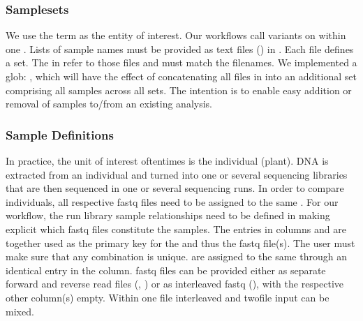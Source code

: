 \documentclass[letterpaper,10pt,english]{sphinxhowto}
\begin{document}
\subsubsection{Samplesets}
\label{\detokenize{index:samplesets}}
We use the term  as the entity of interest. Our workflows call variants on  within one . Lists of sample names must be provided as text files () in . Each file defines a set. The  in  refer to those files and must match the filenames. We implemented a glob: , which will have the effect of concatenating all  files in  into an additional set comprising all samples across all sets. The intention is to enable easy addition or removal of samples to/from an existing analysis.


\subsubsection{Sample Definitions}
\label{\detokenize{index:sample-definitions}}
In practice, the unit of interest oftentimes is the individual (plant). DNA is extracted from an individual and turned into one or several sequencing libraries that are then sequenced in one or several sequencing runs. In order to compare individuals, all respective fastq files need to be assigned to the same . For our workflow, the run \sphinxhyphen{} library \sphinxhyphen{} sample relationships need to be defined in  making explicit which fastq files constitute the samples.
The entries in columns  and  are together used as the primary key for the  and thus the fastq file(s). The user must make sure that any  \sphinxhyphen{}  combination is unique.
 are assigned to the same  through an identical entry in the  column. fastq files can be provided either as separate forward and reverse read files (, ) or as interleaved fastq (), with the respective other column(s) empty. Within one  file interleaved and two\sphinxhyphen{}file input can be mixed.
\end{document}
